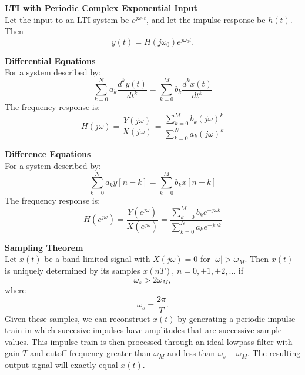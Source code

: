 \documentclass{article}
\begin{document}
\begin{multicols}{2}
    \noindent\textbf{LTI with Periodic Complex Exponential Input} \\
    Let the input to an LTI system be $e^{j\omega_0 t}$, and let the
    impulse response be $h(t)$. Then
    \[
        y(t) = H(j\omega_0)e^{j\omega_0 t}.
    \]

    \noindent\textbf{Differential Equations} \\
    For a system described by:
    \[
        \sum_{k=0}^{N} a_k \frac{d^k y(t)}{dt^k} = \sum_{k=0}^{M} b_k \frac{d^k x(t)}{dt^k}
    \]
    The frequency response is:
    \[ \label{eq:diff_eq_Hjw}
        H(j\omega) = \frac{Y(j\omega)}{X(j\omega)} = \frac{\sum_{k=0}^{M} b_k (j\omega)^k}{\sum_{k=0}^{N} a_k (j\omega)^k}
    \]

    \noindent\textbf{Difference Equations} \\
    For a system described by:
    \[
        \sum_{k=0}^{N} a_k y[n-k] = \sum_{k=0}^{M} b_k x[n-k]
    \]
    The frequency response is:
    \[ \label{eq:diff_eq_Hejomega}
        H(e^{j\omega}) = \frac{Y(e^{j\omega})}{X(e^{j\omega})} = \frac{\sum_{k=0}^{M} b_k e^{-j\omega k}}{\sum_{k=0}^{N} a_k e^{-j\omega k}}
    \]

    \noindent\textbf{Sampling Theorem} \\
    Let $x(t)$ be a band-limited signal with
    $X(j\omega) = 0$ for $|\omega| > \omega_M$.
    Then $x(t)$ is uniquely determined by its samples
    $x(nT)$, $n = 0, \pm 1, \pm 2, \dots$ if
    \begin{equation*}
        \omega_s > 2 \omega_M,
    \end{equation*}
    where
    \begin{equation*}
        \omega_s = \frac{2\pi}{T}.
    \end{equation*}
    Given these samples, we can reconstruct
    $x(t)$ by generating a periodic impulse
    train in which succesive impulses have amplitudes that are
    successive sample values. This impulse train is
    then processed through an ideal lowpass filter
    with gain $T$ and cutoff frequency greater than $\omega_M$ and
    less than $\omega_s - \omega_M$.
    The resulting output signal will exactly equal $x(t)$.


\end{multicols}
\end{document}
